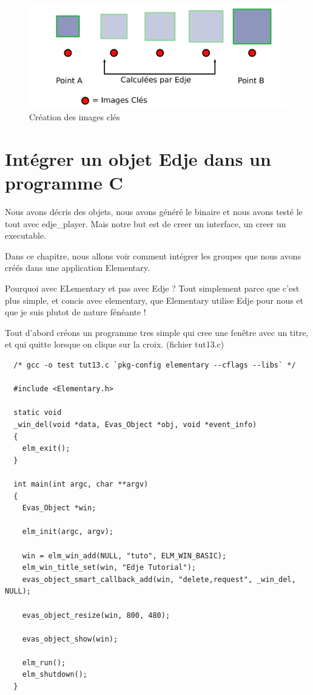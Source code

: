 \documentclass[a4paper]{efr}
\begin{document}
\begin{figure}
  \begin{center}
    \includegraphics[scale=0.5]{images/animation.pdf}
  \end{center}
  \caption{Création des images clés}
\end{figure}

\section{Intégrer un objet Edje dans un programme C}
Nous avons décris des objets, nous avons généré le binaire et nous avons testé
le tout avec edje\_player. Mais notre but est de creer un interface, un creer un
executable.

Dans ce chapitre, nous allons voir comment intégrer les groupes que nous avons
créés dans une application Elementary.

Pourquoi avec ELementary et pas avec Edje ? Tout simplement parce que c'est plus
simple, et concis avec elementary, que Elementary utilise Edje pour nous et que
je suis plutot de nature fénéante !

Tout d'abord créons un programme tres simple qui cree une fenêtre avec un titre,
et qui quitte lorsque on clique sur la croix. (fichier tut13.c)
\begin{lstlisting}
  /* gcc -o test tut13.c `pkg-config elementary --cflags --libs` */

  #include <Elementary.h>

  static void
  _win_del(void *data, Evas_Object *obj, void *event_info)
  {
    elm_exit();
  }

  int main(int argc, char **argv)
  {
    Evas_Object *win;

    elm_init(argc, argv);

    win = elm_win_add(NULL, "tuto", ELM_WIN_BASIC);
    elm_win_title_set(win, "Edje Tutorial");
    evas_object_smart_callback_add(win, "delete,request", _win_del, NULL);

    evas_object_resize(win, 800, 480);

    evas_object_show(win);

    elm_run();
    elm_shutdown();
  }
\end{lstlisting}
\end{document}
